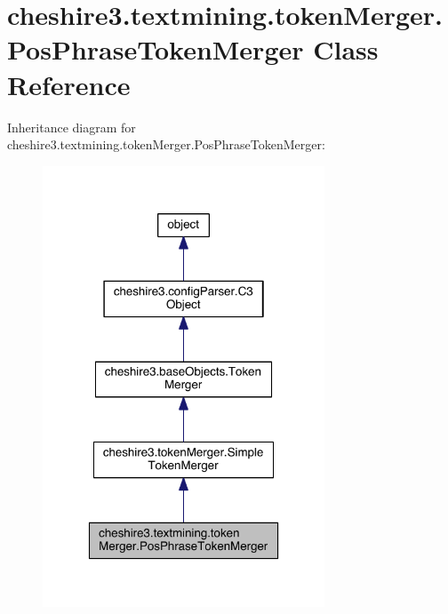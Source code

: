 \hypertarget{classcheshire3_1_1textmining_1_1token_merger_1_1_pos_phrase_token_merger}{\section{cheshire3.\-textmining.\-token\-Merger.\-Pos\-Phrase\-Token\-Merger Class Reference}
\label{classcheshire3_1_1textmining_1_1token_merger_1_1_pos_phrase_token_merger}
}


Inheritance diagram for cheshire3.\-textmining.\-token\-Merger.\-Pos\-Phrase\-Token\-Merger\-:
\nopagebreak
\begin{figure}[H]
\begin{center}
\leavevmode
\includegraphics[width=238pt]{classcheshire3_1_1textmining_1_1token_merger_1_1_pos_phrase_token_merger__inherit__graph}
\end{center}
\end{figure}


